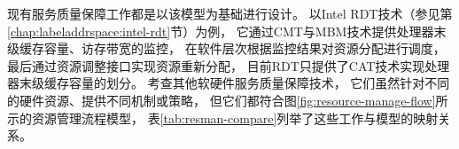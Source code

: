 
现有服务质量保障工作都是以该模型为基础进行设计。
以Intel RDT技术（参见第\ref{chap:labeladdrspace:intel-rdt}节）为例，
它通过CMT与MBM技术提供处理器末级缓存容量、访存带宽的监控，
在软件层次根据监控结果对资源分配进行调度，
最后通过资源调整接口实现资源重新分配，
目前RDT只提供了CAT技术实现处理器末级缓存容量的划分。
考查其他软硬件服务质量保障技术\cite{tang_reqos:_2013,mars_bubble-up:_2011,yang_bubble-flux:_2013,Jigsaw:2013,kasture_ubik:_2014,sanchez_vantage:_2011}，
它们虽然针对不同的硬件资源、提供不同机制或策略，
但它们都符合图\ref{fig:resource-manage-flow}所示的资源管理流程模型，
表\ref{tab:resman-compare}列举了这些工作与模型的映射关系。


